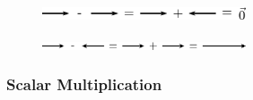     \setcounter{subfigure}{0}


	\begin{figure}[H] %
    \begin{center}
    \label{m38813*id189182!!!underscore!!!media}\label{m38813*id189182!!!underscore!!!printimage}\includegraphics[width=6cm]{col11305.imgs/m38813_PG11C1_037.png} %
        
      \vspace{2pt}
    \vspace{.1in}
    
    \end{center}

 \end{figure}   

    \addtocounter{footnote}{-0}
    
        \par 
        \label{m38813*id189188}
          
    \setcounter{subfigure}{0}


	\begin{figure}[H] %
    \begin{center}
    \label{m38813*id189192!!!underscore!!!media}\label{m38813*id189192!!!underscore!!!printimage}\includegraphics[width=6cm]{col11305.imgs/m38813_PG11C1_038.png} %
        
      \vspace{2pt}
    \vspace{.1in}
    
    \end{center}

 \end{figure}   

    \addtocounter{footnote}{-0}
    
        \par 
      
      \label{m38813*uid37}
            \subsubsection{ Scalar Multiplication}
            \nopagebreak
            
